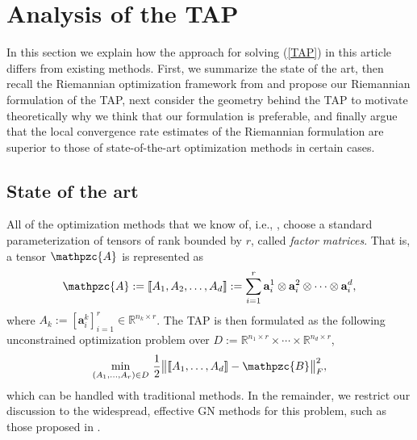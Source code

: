 \documentclass[a4paper,10pt,final]{siamart1116}
\newcommand{\tensor}[1]{\mathpzc{#1}}
\newcommand{\vect}[1]{\mathbf{#1}}
\newcommand{\sten}[3]{\vect{#1}_{#2}^{#3}}
\newcommand{\R}{\mathbb{R}}
\newcommand{\refeqn}[1]{{(\ref{#1})}}
\numberwithin{equation}{section}
\numberwithin{figure}{section}
\numberwithin{table}{section}
\numberwithin{theorem}{section}
\begin{document}
\section{Analysis of the TAP} \label{sec_trd}
In this section we explain how the approach for solving \refeqn{TAP} in this article differs from existing methods. First, we summarize the state of the art, then recall the Riemannian optimization framework from \cite{AMS2008} and propose our Riemannian formulation of the TAP, next consider the geometry behind the TAP to motivate theoretically why we think that our formulation is preferable, and finally argue that the local convergence rate estimates of the Riemannian formulation are superior to those of state-of-the-art optimization methods in certain cases.

\subsection{State of the art} \label{sec_stateoftheart}
All of the optimization methods that we know of, i.e., \cite{Acar2011,Harshman1970,Caroll1970,Hayashi1982,Paatero1999,Paatero1997,Phan2013,Phan2013a,Sorber2013a,Tomasi2006,DeSterck2012,dSM2013,CHLZ2012,LUZ2015}, choose a standard parameterization of tensors of rank bounded by $r$, called \emph{factor matrices}. That is, a tensor $\tensor{A}$ is represented as
\begin{align} \label{factor_matrices_def}
 \tensor{A} := {\text\textlbrackdbl} A_1, A_2, \ldots, A_d {\text\textrbrackdbl} := \sum_{i=1}^r \sten{a}{i}{1}\otimes\sten{a}{i}{2}\otimes\cdots\otimes \sten{a}{i}{d},
\end{align}
where $A_k := [\sten{a}{i}{k}]_{i=1}^r \in \R^{n_k\times r}$.
The TAP is then formulated as the following unconstrained optimization problem over $D := \R^{n_1 \times r} \times \cdots \times \R^{n_d \times r}$,
\begin{align}\label{eqn_optimization_problem_classic}
\min_{(A_1,\ldots,A_r)\in D} \,\frac{1}{2} \bigl\| {\text\textlbrackdbl} A_1, \ldots, A_d {\text\textrbrackdbl} - \tensor{B} \bigr\|_F^2,
\end{align}
which can be handled with traditional methods. In the remainder, we restrict our discussion to the widespread, effective GN methods for this problem, such as those proposed in  \cite{Acar2011,Hayashi1982,Paatero1999,Paatero1997,Phan2013a,Sorber2013a,Tomasi2006}.
\end{document}
